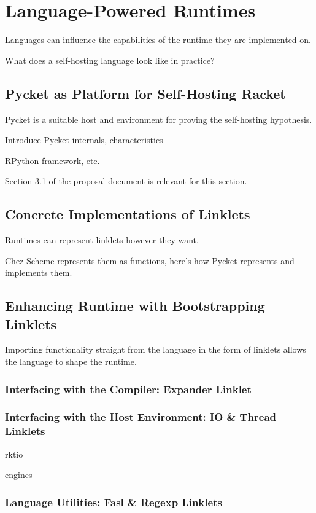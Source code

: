 \chapter{Language-Powered Runtimes}
	\begin{chapterpoint}
		Languages can influence the capabilities of the runtime they are implemented on.

		What does a self-hosting language look like in practice?

	\end{chapterpoint}

	\section{Pycket as Platform for Self-Hosting Racket}

		\begin{mainpoint}
			Pycket is a suitable host and environment for proving the self-hosting hypothesis.
		\end{mainpoint}

		\begin{todo}[TODO]
			Introduce Pycket internals, characteristics

			RPython framework, etc.
		\end{todo}

		\begin{todo}[Import]
				Section 3.1 of the proposal document is relevant for this section.
		\end{todo}

	\section{Concrete Implementations of Linklets}

		\begin{mainpoint}
			Runtimes can represent linklets however they want.

			Chez Scheme represents them as functions, here's how Pycket represents and implements them.
		\end{mainpoint}

	\section{Enhancing Runtime with Bootstrapping Linklets}
		\begin{mainpoint}
			Importing functionality straight from the language in the form of linklets allows the language to shape the runtime.
		\end{mainpoint}
		\subsection{Interfacing with the Compiler: Expander Linklet}

		\subsection{Interfacing with the Host Environment: IO \& Thread Linklets}
			\begin{todo}[TODO]
				rktio
			\end{todo}
			\begin{todo}[TODO]
				engines
			\end{todo}
		\subsection{Language Utilities: Fasl \& Regexp Linklets}

